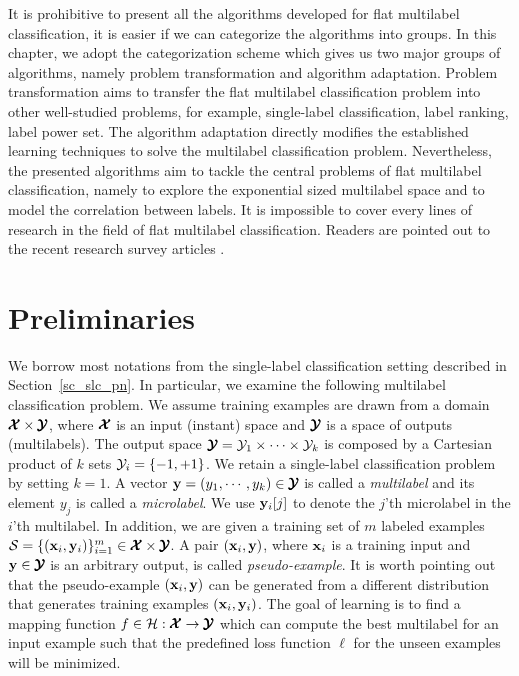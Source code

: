 {It is prohibitive to present all the algorithms developed for flat multilabel classification, it is easier if we can categorize the algorithms into groups.
In this chapter, we adopt the categorization scheme \citep{Tsoumakas07multi,Tsoumakas10mining} which gives us two major groups of algorithms, namely problem transformation and algorithm adaptation.
Problem transformation aims to transfer the flat multilabel classification problem into other well-studied problems, for example, single-label classification, label ranking, label power set.
The algorithm adaptation directly modifies the established learning techniques to solve the multilabel classification problem.
Nevertheless, the presented algorithms aim to tackle the central problems of flat multilabel classification, namely to explore the exponential sized multilabel space and to model the correlation between labels.
It is impossible to cover every lines of research in the field of flat multilabel classification.
Readers are pointed out to the recent research survey articles \citep{Tsoumakas07multi,Tsoumakas10mining,Zhang14a}.



\section{Preliminaries} \label{sc_mlc_pn}

We borrow most notations from the single-label classification setting described in Section~\ref{sc_slc_pn}.
In particular, we examine the following {multilabel classification} problem.
We assume training examples are drawn from a domain $\pmb {\mathcal{X}}\times\pmb {\mathcal{Y}}$, where $\pmb {\mathcal{X}}$ is an input (instant) space and $\pmb {\mathcal{Y}}$ is a space of outputs (multilabels).
The output space $\pmb {\mathcal{Y}} = \mathcal{Y}_1\times\cdots\times\mathcal{Y}_k$ is composed by a Cartesian product of $k$ sets $\mathcal{Y}_i=\{-1,+1\}$.
We retain a single-label classification problem by setting $k=1$.
A vector $\mathbf {y}=(y_1,\cdots,y_k)\in\pmb {\mathcal{Y}}$ is called a \textit{multilabel} and its element $y_j$ is called a \textit{microlabel}.
We use $\mathbf {y}_i[j]$ to denote the $j$'th microlabel in the $i$'th multilabel.
In addition, we are given a training set of $m$ labeled examples $\mathcal{S}=\{(\mathbf {x}_i,\mathbf {y}_i)\}_{i=1}^{m}\in\pmb {\mathcal{X}}\times\pmb {\mathcal{Y}}$. 
A pair $(\mathbf {x}_i,\mathbf {y})$, where $\mathbf {x}_i$ is a training input and $\mathbf {y}\in\pmb {\mathcal{Y}}$ is an arbitrary output, is called \textit{pseudo-example}.
It is worth pointing out that the pseudo-example $(\mathbf {x}_i,\mathbf {y})$ can be generated from a different distribution that generates training examples $(\mathbf {x}_i,\mathbf {y}_i)$.
The goal of learning is to find a mapping function $f\in\mathcal{H}:\pmb {\mathcal{X}}\rightarrow\pmb {\mathcal{Y}}$ which can compute the best multilabel for an input example such that the predefined loss function $\ell$ for the unseen examples will be minimized.



}
